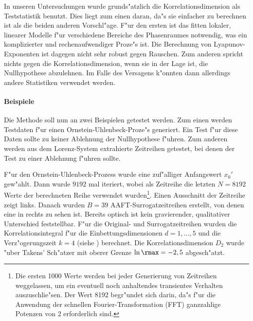 In unseren Untersuchungen wurde grunds"atzlich die Korrelationsdimension als Teststatistik 
benutzt. Dies liegt zum einen daran, da"s sie einfacher zu berechnen ist als die beiden
anderen Vorschl"age. F"ur den ersten ist das fitten lokaler, linearer Modelle f"ur
verschiedene Bereiche des Phasenraumes notwendig, was ein komplizierter und
rechenaufwendiger Proze"s ist. Die Berechnung von Lyapunov-Exponenten ist dagegen nicht
sehr robust gegen Rauschen. Zum anderen spricht nichts gegen die Korrelationsdimension,
wenn sie in der Lage ist, die Nullhypothese abzulehnen. Im Falle des Versagens k"onnten
dann allerdings andere Statistiken verwendet werden. 

\paragraph{Beispiele}
Die Methode soll nun an zwei Beispielen getestet werden. Zum einen werden Testdaten
f"ur einen Ornstein-Uhlenbeck-Proze"s generiert. Ein Test f"ur diese Daten sollte zu
keiner Ablehnung der Nullhypothese f"uhren. Zum anderen werden aus dem Lorenz-System
extrahierte Zeitreihen getestet, bei denen der Test zu einer Ablehnung f"uhren sollte.

F"ur den Ornstein-Uhlenbeck-Prozess wurde eine zuf"alliger Anfangswert $x_0'$
gew"ahlt. Dann wurde  $9192$ mal iteriert, wobei als Zeitreihe die
letzten $N=8192$ Werte der berechneten Reihe verwendet wurden\footnote{Die ersten 1000
  Werte werden bei jeder Generierung von Zeitreihen weggelassen, um ein eventuell noch
  anhaltendes transientes Verhalten auszuschlie"sen. Der Wert 8192 begr"undet sich darin,
  da"s f"ur die Anwendung der schnellen Fourier-Transformation (FFT) ganzzahlige  Potenzen
  von 2 erforderlich sind. }. Einen Ausschnitt der Zeitreihe zeigt 
links. Danach wurden $B=39$ AAFT-Surrogatzeitreihen erstellt, von denen eine in
 rechts zu sehen ist. Bereits optisch ist kein gravierender,
qualitativer Unterschied feststellbar. F"ur die Original- und Surrogatzeitreihen wurden
die Korrelationsintegral f"ur die Einbettungsdimensionen $d=1,\dots,5$ und die Verz"ogerungszeit
$k=4$ (siehe ) berechnet. Die Korrelationsdimension
$D_2$ wurde "uber Takens' Sch"atzer mit oberer Grenze $\ln\rmax=-2,5$ abgesch"atzt.

